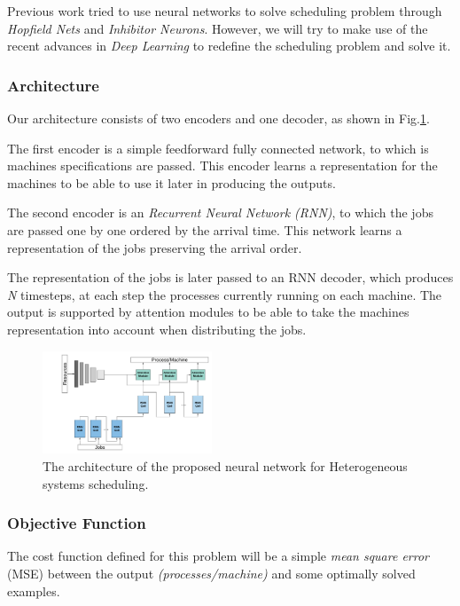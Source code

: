 \documentclass[twocolumn,11pt]{IEEEtran}
\begin{document}
    Previous work tried to use neural networks to solve scheduling problem through \emph{Hopfield Nets} and \emph{Inhibitor Neurons}. However, we will try to make use of the recent advances in \emph{Deep Learning} to redefine the scheduling problem and solve it.
    
    \subsubsection{Architecture}
    Our architecture consists of two encoders and one decoder, as shown in Fig.\ref{fig:nn}.

    The first encoder is a simple feedforward fully connected network, to which is machines specifications are passed. This encoder learns a representation for the machines to be able to use it later in producing the outputs. 
    
    The second encoder is an \emph{Recurrent Neural Network (RNN)}, to which the jobs are passed one by one ordered by the arrival time. This network learns a representation of the jobs preserving the arrival order. 
    
    The representation of the jobs is later passed to an RNN decoder, which produces \emph{N} timesteps, at each step the processes currently running on each machine. The output is supported by attention modules to be able to take the machines representation into account when distributing the jobs.
    
    \begin{figure}[hp]
        \centering
        \includegraphics[width=0.45\textwidth]{sched_nn}
        \caption{The architecture of the proposed neural network for Heterogeneous systems scheduling.}
        \label{fig:nn}
    \end{figure}
    
    \subsubsection{Objective Function}
    The cost function defined for this problem will be a simple \emph{mean square error} (MSE) between the output \emph{(processes/machine)} and some optimally solved examples.
    
\end{document}
